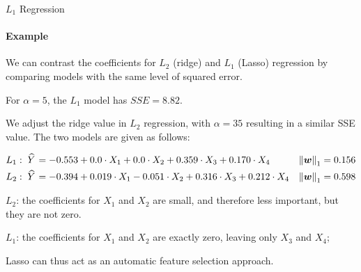 \begin{frame}{$L_1$ Regression}
\framesubtitle{Example}


    
    We can contrast the coefficients for $L_2$ (ridge)
    and $L_1$ (Lasso) regression by comparing models with the same level
    of squared error.

	\medskip

    For $\alpha=5$, the $L_1$ model has $SSE = 8.82$.

	\medskip

    We adjust the ridge value in $L_2$ regression, with $\alpha=35$
    resulting in a similar SSE value. 
    The two models are given as follows:
\begin{small}
    \begin{align*}
        L_1:\; \mkern 1.5mu\widehat{\mkern-1.5muY}\mkern 1.5mu & = -0.553 + 0.0 \cdot X_1  + 0.0 \cdot X_2 + 
        0.359 \cdot X_3 + 0.170 \cdot X_4 & \left\lVert{\boldsymbol w}\right\rVert_1 = 0.156\\
        L_2:\; \mkern 1.5mu\widehat{\mkern-1.5muY}\mkern 1.5mu & = -0.394 + 0.019 \cdot X_1  - 0.051 \cdot X_2 + 
        0.316 \cdot X_3 + 0.212 \cdot X_4 & \left\lVert{\boldsymbol w}\right\rVert_1 = 0.598
    \end{align*}
\end{small}

$L_2$: 
    the coefficients for $X_1$ and $X_2$ are small, and
    therefore less important, but 
    they are not zero. 

	\medskip

 $L_1$: the
    coefficients for $X_1$
    and $X_2$ are exactly zero, leaving only $X_3$ and $X_4$; 

	\medskip

    Lasso can thus act as an automatic feature selection approach.
    
\end{frame}
%
%

